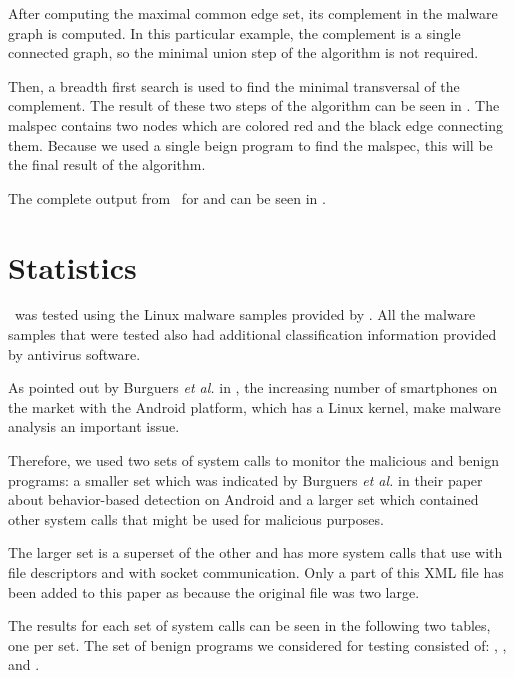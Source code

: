 After computing the maximal common edge set, its complement in the malware graph is computed. In this particular example, the complement is a single connected graph, so the minimal union step of the algorithm is not required.

Then, a breadth first search is used to find the minimal transversal of the complement. The result of these two steps of the algorithm can be seen in . The malspec contains two nodes which are colored red and the black edge connecting them. Because we used a single beign program to find the malspec, this will be the final result of the algorithm.


The complete output from \project\ for  and  can be seen in .

\section{Statistics}
\label{fifth:test-statistics}

\project\ was tested using the Linux malware samples provided by \cite{open-malware}. All the malware samples that were tested also had additional classification information provided by antivirus software.

As pointed out by Burguers \textit{et al.} in \cite{crowdroid-malware-android}, the increasing number of smartphones on the market with the Android platform, which has a Linux kernel, make malware analysis an important issue.

Therefore, we used two sets of system calls to monitor the malicious and benign programs: a smaller set which was indicated by Burguers \textit{et al.} in their paper about behavior-based detection on Android \cite{crowdroid-malware-android} and a larger set which contained other system calls that might be used for malicious purposes.

The larger set is a superset of the other and has more system calls that use with file descriptors and with socket communication. Only a part of this XML file has been added to this paper as  because the original file was two large.

The results for each set of system calls can be seen in the following two tables, one per set. The set of benign programs we considered for testing consisted of: , ,  and .

